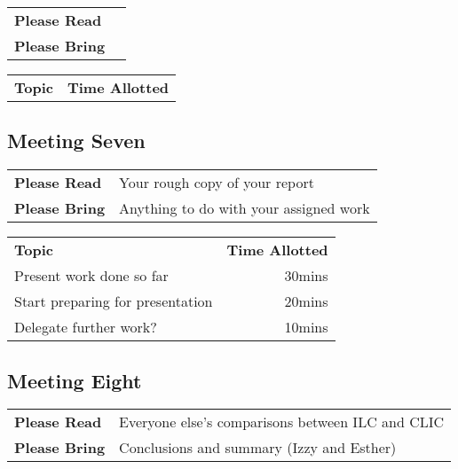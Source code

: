 \begin{tabularx}{\textwidth}{l X}
  \textbf{Please Read} &  \\
  \textbf{Please Bring} &  \\
\end{tabularx}

\vspace{5mm}

\begin{tabularx}{\textwidth}{X r}
  \textbf{Topic} & \textbf{Time Allotted} \\
 
 
 
\end{tabularx}

\subsection{Meeting Seven}

\begin{tabularx}{\textwidth}{l X}
  \textbf{Please Read} & Your rough copy of your report \\
  \textbf{Please Bring} & 	
Anything to do with your assigned work \\
\end{tabularx}

\vspace{5mm}

\begin{tabularx}{\textwidth}{X r}
  \textbf{Topic} & \textbf{Time Allotted} \\
 
 Present work done so far &
30mins \\
 
Start preparing for presentation &
20mins \\
 
Delegate further work? &
10mins \\
 
\end{tabularx}

\subsection{Meeting Eight}

\begin{tabularx}{\textwidth}{l X}
  \textbf{Please Read} &  Everyone else’s comparisons between ILC and CLIC \\
  \textbf{Please Bring} & Conclusions and summary (Izzy and Esther) \\
\end{tabularx}

